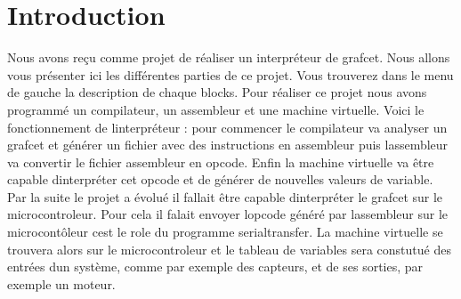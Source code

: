 \hypertarget{index_Introduction}{}\section{Introduction}\label{index_Introduction}
Nous avons reçu comme projet de réaliser un interpréteur de grafcet. Nous allons vous présenter ici les différentes parties de ce projet. Vous trouverez dans le menu de gauche la description de chaque blocks. Pour réaliser ce projet nous avons programmé un compilateur, un assembleur et une machine virtuelle. Voici le fonctionnement de l\textquotesingle{}interpréteur \+: pour commencer le compilateur va analyser un grafcet et générer un fichier avec des instructions en assembleur puis l\textquotesingle{}assembleur va convertir le fichier assembleur en opcode. Enfin la machine virtuelle va être capable d\textquotesingle{}interpréter cet opcode et de générer de nouvelles valeurs de variable. Par la suite le projet a évolué il fallait être capable d\textquotesingle{}interpréter le grafcet sur le microcontroleur. Pour cela il falait envoyer l\textquotesingle{}opcode généré par l\textquotesingle{}assembleur sur le microcontôleur c\textquotesingle{}est le role du programme serialtransfer. La machine virtuelle se trouvera alors sur le microcontroleur et le tableau de variables sera constutué des entrées d\textquotesingle{}un système, comme par exemple des capteurs, et de ses sorties, par exemple un moteur.